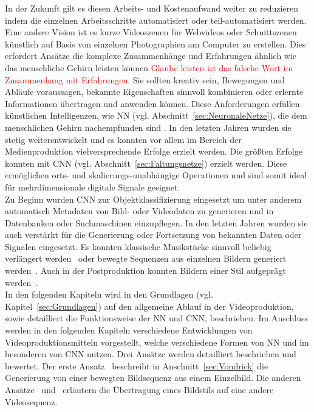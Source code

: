 \documentclass[times, 11pt,twocolumn]{article}
\begin{document}
In der Zukunft gilt es diesen Arbeits- und Kostenaufwand weiter zu reduzieren indem die einzelnen Arbeitsschritte automatisiert oder teil-automatisiert werden. Eine andere Vision ist es kurze Videoszenen für Webvideos oder Schnittszenen künstlich auf Basis von einzelnen Photographien am Computer zu erstellen. Dies erfordert Ansätze die komplexe Zusammenhänge und Erfahrungen ähnlich wie das menschliche Gehirn leisten können \textcolor{red}{Glaube leisten ist das falsche Wort im Zusammenhang mit Erfahrungen}. Sie sollten kreativ sein, Bewegungen und Abläufe voraussagen, bekannte Eigenschaften sinnvoll kombinieren oder erlernte Informationen übertragen und anwenden können. Diese Anforderungen erfüllen künstlichen Intelligenzen, wie NN (vgl. Abschnitt~\ref{sec:NeuronaleNetze}), die dem menschlichen Gehirn nachempfunden sind \cite{McCaigDG16}. In den letzten Jahren wurden sie stetig weiterentwickelt und es konnten vor allem im Bereich der Medienproduktion vielversprechende Erfolge erzielt werden. Die größten Erfolge konnten mit CNN (vgl. Abschnitt~\ref{sec:Faltungsnetze}) erzielt werden. Diese ermöglichen orts- und skalierungs-unabhängige Operationen und sind somit ideal für mehrdimensionale digitale Signale geeignet.\\

Zu Beginn wurden CNN zur Objektklassifizierung eingesetzt um unter anderem automatisch Metadaten von Bild- oder Videodaten zu generieren und in Datenbanken oder Suchmaschinen einzupflegen. In den letzten Jahren wurden sie auch verstärkt für die Generierung oder Fortsetzung von bekannten Daten oder Signalen eingesetzt. Es konnten klassische Musikstücke sinnvoll beliebig verlängert werden~\cite{OordDZSVGKSK16} oder bewegte Sequenzen aus einzelnen Bildern generiert werden~\cite{VondrickPT16}. Auch in der Postproduktion konnten Bildern einer Stil aufgeprägt werden~\cite{DeepDream}. \\

In den folgenden Kapiteln wird in den Grundlagen (vgl. Kapitel~\ref{sec:Grundlagen}) auf den allgemeine Ablauf in der Videoproduktion, sowie detailliert die Funktionsweise der NN und CNN, beschrieben. Im Anschluss werden in den folgenden Kapiteln verschiedene Entwicklungen von Videoproduktionsmitteln vorgestellt, welche verschiedene Formen von NN und im besonderen von CNN nutzen. Drei Ansätze werden detailliert beschrieben und bewertet. Der erste Ansatz~\cite{VondrickPT16} beschreibt in Anschnitt~\ref{sec:Vondrick} die Generierung von einer bewegten Bildsequenz aus einem Einzelbild. Die anderen Ansätze~ \cite{DeepDream} und~\cite{GatysEB15a} erläutern die Übertragung eines Bildstils auf eine andere Videosequenz.
\end{document}
